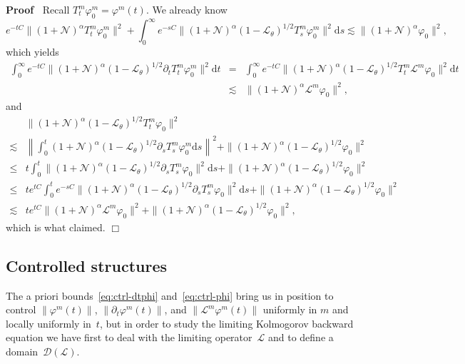 \documentclass{article}
\newcommand{\mathd}{\mathrm{d}}
\newenvironment{proof}{\noindent\textbf{Proof\ }}{\hspace*{\fill}$\Box$\medskip}
\begin{document}
\begin{proof}
  Recall $T^m_t \varphi^m_0 = \varphi^m (t)$. We already know
  \[ e^{- t C} \| (1 +\mathcal{N})^{\alpha} T^m_t \varphi^m_0 \|^2 +
     \int_0^{\infty} e^{- s C} \| (1 +\mathcal{N})^{\alpha} (1
     -\mathcal{L}_{\theta})^{1 / 2} T^m_s \varphi^m_0 \|^2 \mathd s \lesssim
     \| (1 +\mathcal{N})^{\alpha} \varphi_0 \|^2, \]
  which yields
  \begin{eqnarray*}
    \int_0^{\infty} e^{- t C} \| (1 +\mathcal{N})^{\alpha} (1
    -\mathcal{L}_{\theta})^{1 / 2} \partial_t T^m_t \varphi^m_0 \|^2 \mathd t
    & = & \int_0^{\infty} e^{- t C} \| (1 +\mathcal{N})^{\alpha} (1
    -\mathcal{L}_{\theta})^{1 / 2} T^m_t \mathcal{L}^m \varphi_0 \|^2 \mathd
    t\\
    & \lesssim & \| (1 +\mathcal{N})^{\alpha} \mathcal{L}^m \varphi_0 \|^2,
  \end{eqnarray*}
  and
  \[ \begin{array}{ll}
       & \| (1 +\mathcal{N})^{\alpha} (1 -\mathcal{L}_{\theta})^{1 / 2} T^m_t
       \varphi_0 \|^2\\
       \lesssim & \left\| \int_0^t (1 +\mathcal{N})^{\alpha} (1
       -\mathcal{L}_{\theta})^{1 / 2} \partial_s T^m_s \varphi^m_0 \mathd s
       \right\|^2 + \| (1 +\mathcal{N})^{\alpha} (1 -\mathcal{L}_{\theta})^{1
       / 2} \varphi_0 \|^2\\
       \leqslant & t \int_0^t \| (1 +\mathcal{N})^{\alpha} (1
       -\mathcal{L}_{\theta})^{1 / 2} \partial_s T^m_s \varphi_0 \|^2 \mathd s
       + \| (1 +\mathcal{N})^{\alpha} (1 -\mathcal{L}_{\theta})^{1 / 2}
       \varphi_0 \|^2\\
       \leqslant & t e^{t C} \int_0^t e^{- s C} \| (1 +\mathcal{N})^{\alpha}
       (1 -\mathcal{L}_{\theta})^{1 / 2} \partial_s T^m_s \varphi_0 \|^2
       \mathd s + \| (1 +\mathcal{N})^{\alpha} (1 -\mathcal{L}_{\theta})^{1 /
       2} \varphi_0 \|^2\\
       \lesssim & t e^{t C} \| (1 +\mathcal{N})^{\alpha} \mathcal{L}^m
       \varphi_0 \|^2 + \| (1 +\mathcal{N})^{\alpha} (1
       -\mathcal{L}_{\theta})^{1 / 2} \varphi_0 \|^2,
     \end{array} \]
  which is what claimed.
\end{proof}

\subsection{Controlled structures}

The a priori bounds~{\eqref{eq:ctrl-dtphi}} and~{\eqref{eq:ctrl-phi}} bring us
in position to control $\| \varphi^m (t) \|$, $\| \partial_t \varphi^m (t)
\|$, and $\| \mathcal{L}^m \varphi^m (t) \|$ uniformly in $m$ and locally
uniformly in~$t$, but in order to study the limiting Kolmogorov backward
equation we have first to deal with the limiting operator~$\mathcal{L}$ and to
define a domain~$\mathcal{D} (\mathcal{L})$.
\end{document}
